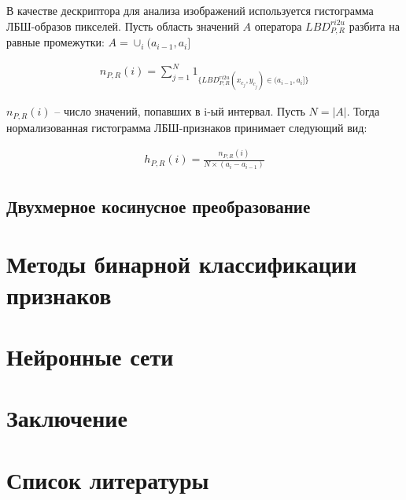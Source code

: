 \documentclass[a4paper, 14pt]{extarticle}	%
\begin{document}
В качестве дескриптора для анализа изображений используется гистограмма ЛБШ-образов пикселей. Пусть область значений $A$ оператора $LBD_{P,R}^{ri2u}$ разбита на равные промежутки: 
$ A = \cup_i(a_{i-1},a_i]$

\begin{gather}
n_{P,R}(i)=\sum\limits_{j=1}^{N}1_{\{LBD_{P,R}^{ri2u}(x_{c_j},y_{c_j})\in(a_{i-1},a_i]\}}
\end{gather}

$n_{P,R}(i)$ -- число значений, попавших в i-ый интервал. Пусть $N = |A|$. Тогда нормализованная гистограмма ЛБШ-признаков принимает следующий вид:

\begin{gather}
h_{P,R}(i)=\frac{n_{P,R}(i)}{N \times (a_i - a_{i-1})}
\end{gather}

\subsection{Двухмерное косинусное преобразование}


\newpage
\section{Методы бинарной классификации признаков}

\newpage
\section{Нейронные сети}


\newpage
\section*{Заключение}


\newpage
\section*{Список литературы}
\end{document}
